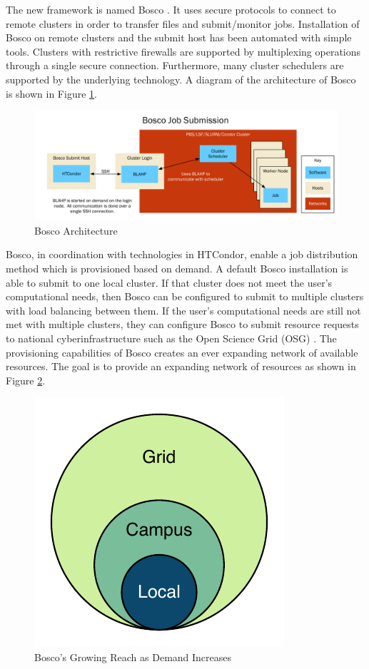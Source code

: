The new framework is named Bosco \cite{weitzel2014accessing}.  It uses secure protocols to connect to remote clusters in order to transfer files and submit/monitor jobs.  Installation of Bosco on remote clusters and the submit host has been automated with simple tools.  Clusters with restrictive firewalls are supported by multiplexing operations through a single secure connection.  Furthermore, many cluster schedulers are supported by the underlying technology.  A diagram of the architecture of Bosco is shown in Figure \ref{fig:introboscoarch}.

\begin{figure}[h!t]
	\centering
	\includegraphics[width=\textwidth]{images/ArchitectureGraph1.pdf}
	\caption{Bosco Architecture}
	\label{fig:introboscoarch}
\end{figure}

Bosco, in coordination with technologies in HTCondor, enable a job distribution method which is provisioned based on demand.  A default Bosco installation is able to submit to one local cluster.  If that cluster does not meet the user's computational needs, then Bosco can be configured to submit to multiple clusters with load balancing between them.  If the user's computational needs are still not met with multiple clusters, they can configure Bosco to submit resource requests to national cyberinfrastructure such as the Open Science Grid (OSG) \cite{pordes2007open}.  The provisioning capabilities of Bosco creates an ever expanding network of available resources. The goal is to provide an expanding network of resources as shown in Figure \ref{fig:boscogrowing}.

\begin{figure}[h!t]
	\centering
	\includegraphics{images/BoscoGrowing.pdf}
	\caption{Bosco's Growing Reach as Demand Increases}
	\label{fig:boscogrowing}
\end{figure}

